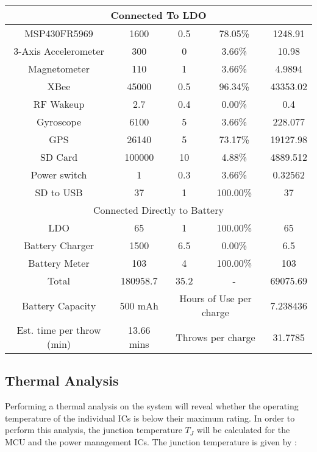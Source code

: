 \begin{center}
\begin{longtable}{|c|c|c|c|c|}
    \multicolumn{5}{|c|}{\cellcolor{Gray}Connected To LDO} \\ \hline
    MSP430FR5969 & 1600  & 0.5   & 78.05\% & 1248.91 \\ \hline
    3-Axis Accelerometer & 300   & 0     & 3.66\% & 10.98 \\ \hline
    Magnetometer & 110   & 1     & 3.66\% & 4.9894 \\ \hline
    XBee  & 45000 & 0.5   & 96.34\% & 43353.02 \\ \hline
    RF Wakeup & 2.7   & 0.4   & 0.00\% & 0.4 \\ \hline
    Gyroscope & 6100  & 5     & 3.66\% & 228.077 \\ \hline
    GPS   & 26140 & 5     & 73.17\% & 19127.98 \\ \hline
    SD Card & 100000 & 10    & 4.88\% & 4889.512 \\ \hline
    Power switch & 1     & 0.3   & 3.66\% & 0.32562 \\ \hline
    SD to USB & 37    & 1     & 100.00\% & 37 \\ \hline
    \multicolumn{5}{|c|}{\cellcolor{Gray}Connected Directly to Battery} \\ \hline
    LDO   & 65    & 1     & 100.00\% & 65 \\ \hline
    Battery Charger & 1500  & 6.5   & 0.00\% & 6.5 \\ \hline
    Battery Meter & 103   & 4     & 100.00\% & 103 \\ \hline \hline
    Total & 180958.7 & 35.2  &    -   & 69075.69 \\ \hline \hline
    \cellcolor{Gray}Battery Capacity &   500 mAh    &      \multicolumn{2}{c|}{\cellcolor{Gray}Hours of Use per charge} & 7.238436 \\ \hline
    \cellcolor{Gray}Est. time per throw (min) & 13.66 mins  &    \multicolumn{2}{c|}{\cellcolor{Gray}Throws per charge} & 31.7785 \\ \hline
    \end{longtable}%
\end{center}%

\subsection{Thermal Analysis}
Performing a thermal analysis on the system will reveal whether the operating temperature of the individual ICs is below their maximum rating.  In order to perform this analysis, the junction temperature $T_J$ will be calculated for the MCU and the power management ICs.  The junction temperature is given by \cite[419]{Jimenez2013}:


